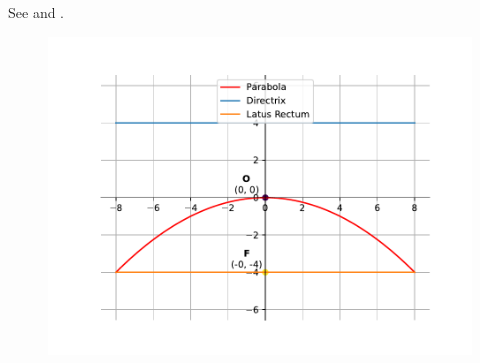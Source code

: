 See 
and 
.
\begin{figure}[H]
	\begin{center} 
	    \includegraphics[width=0.75\columnwidth]{chapters/11/11/2/4/figs/fig.pdf}
	\end{center}
\caption{}
\label{fig:chapters/11/11/2/4/Fig1}
\end{figure}
